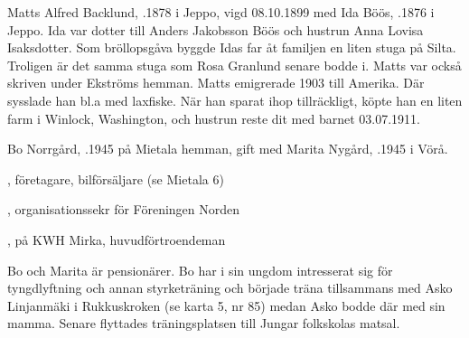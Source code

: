 %
Matts Alfred Backlund, .1878 i Jeppo, vigd 08.10.1899 med Ida Böös, .1876 i Jeppo. Ida var dotter till Anders Jakobsson Böös och hustrun Anna Lovisa Isaksdotter. Som bröllopsgåva byggde Idas far åt familjen en liten stuga på Silta. Troligen är det samma stuga som Rosa Granlund senare bodde i. Matts var också skriven under Ekströms hemman. Matts emigrerade 1903 till Amerika. Där sysslade han bl.a med laxfiske. När han sparat ihop tillräckligt, köpte han en liten farm i Winlock, Washington, och hustrun reste dit med barnet 03.07.1911.
\begin{jhchildren}
  \item {}
  \item {}
  \item {}
  \item {}
  \item {}
\end{jhchildren}



%



%
Bo Norrgård, .1945  på Mietala hemman, gift med Marita Nygård, .1945 i Vörå.
\begin{jhchildren}
  \item {}, företagare, bilförsäljare (se Mietala 6)
  \item {}, organisationssekr för Föreningen Norden
  \item {}, på KWH Mirka, huvudförtroendeman
\end{jhchildren}

Bo och Marita är pensionärer. Bo har i sin ungdom intresserat sig för tyngdlyftning och annan styrketräning och började träna tillsammans med Asko Linjanmäki i Rukkuskroken (se karta 5, nr 85) medan Asko bodde där med sin mamma. Senare flyttades träningsplatsen till Jungar folkskolas matsal.

